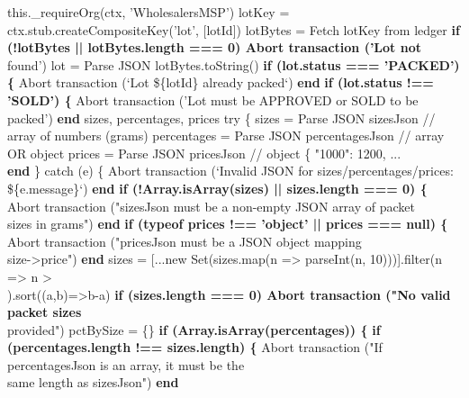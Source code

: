 \documentclass[12pt]{article}
\begin{document}
\begin{algorithm}[H]
\caption{packLotIntoPackets() (Part 1 of 4)}
this.\_requireOrg(ctx, 'WholesalersMSP')\;
lotKey = ctx.stub.createCompositeKey('lot', [lotId])\;
lotBytes = Fetch lotKey from ledger\;
\textbf{if (!lotBytes || lotBytes.length === 0) Abort transaction ('Lot not}\\
\quad found')\;
lot = Parse JSON lotBytes.toString()\;
\textbf{if (lot.status === 'PACKED') \{}\;
Abort transaction (`Lot \$\{lotId\} already packed`)\;
\textbf{end}\;
\textbf{if (lot.status !== 'SOLD') \{}\;
Abort transaction ('Lot must be APPROVED or SOLD to be packed')\;
\textbf{end}\;
sizes, percentages, prices\;
try \{\;
sizes = Parse JSON sizesJson          // array of numbers (grams)\;
percentages = Parse JSON percentagesJson // array OR object\;
prices = Parse JSON pricesJson        // object \{ "1000": 1200, ...\\
\textbf{\quad end}\;
\} catch (e) \{\;
Abort transaction (`Invalid JSON for sizes/percentages/prices:\\
\quad \$\{e.message\}`)\;
\textbf{end}\;
\textbf{if (!Array.isArray(sizes) || sizes.length === 0) \{}\;
Abort transaction ("sizesJson must be a non-empty JSON array of packet\\
\quad sizes in grams")\;
\textbf{end}\;
\textbf{if (typeof prices !== 'object' || prices === null) \{}\;
Abort transaction ("pricesJson must be a JSON object mapping\\
\quad size->price")\;
\textbf{end}\;
sizes = [...new Set(sizes.map(n => parseInt(n, 10)))].filter(n => n >\\
).sort((a,b)=>b-a)\;
\textbf{if (sizes.length === 0) Abort transaction ("No valid packet sizes}\\
\quad provided")\;
pctBySize = \{\}\;
\textbf{if (Array.isArray(percentages)) \{}\;
\textbf{if (percentages.length !== sizes.length) \{}\;
Abort transaction ("If percentagesJson is an array, it must be the\\
\quad same length as sizesJson")\;
\textbf{end}\;
\end{algorithm}
\end{document}
